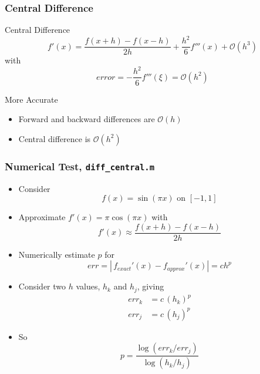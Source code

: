 \documentclass[10pt]{beamer}
\newcommand{\mO}{{\mathcal{O}}}
\begin{document}
\begin{frame}
\frametitle{Central Difference}
\begin{block}{Central Difference}
\begin{equation*}
  f'(x) = \frac{f(x+h) - f(x-h)}{2 h} + \frac{h^2}{6}f'''(x) + \mO(h^3)
\end{equation*}
with
\begin{equation*}
  error = - \frac{h^2}{6}f'''(\xi) = \mO(h^2)
\end{equation*}
\end{block}
\bigskip
\begin{block}{More Accurate}
\begin{itemize}
    \item Forward and backward differences are $\mO(h)$ 
    \item Central difference is $\mO(h^2)$
\end{itemize}
\end{block}
\end{frame}
\begin{frame}
\frametitle{Numerical Test, \texttt{diff_central.m}}
\begin{itemize}
    \item Consider
    \begin{equation*}
      f(x) = \sin(\pi x)\,\, \text{on}\,\, [-1,1]
    \end{equation*}
    \item Approximate $f'(x) = \pi \cos(\pi x)$ with
    \begin{equation*}
      f'(x) \approx \frac{f(x+h)-f(x-h)}{2 h}
    \end{equation*}
    \item<2-> Numerically estimate $p$ for
        \[ err = |\,f_{exact}'(x) - f_{approx}'(x)| = c h^p \]
    \item<3-> Consider two $h$ values, $h_k$ and $h_j$, giving
    \begin{align*}
      err_k & = c\, (h_k)^p\\
      err_j & = c\, (h_j)^p
    \end{align*}
    \item<4-> So
    \begin{equation*}
      p = \frac{ \log(err_k/err_j) }{ \log(h_k/h_j) }
    \end{equation*}
\end{itemize}
\end{frame}
\end{document}
